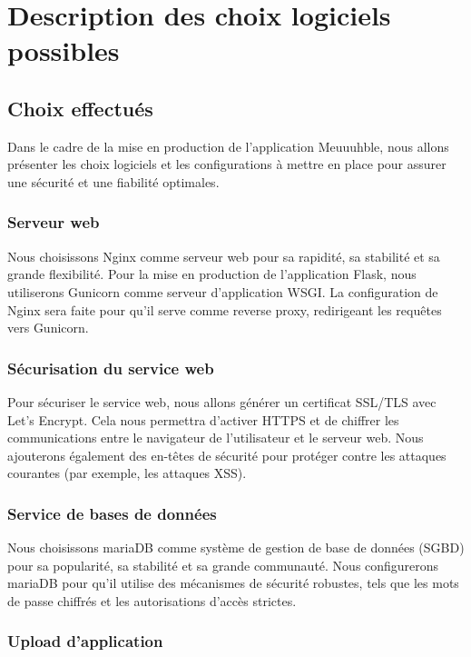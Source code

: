 \chapter{Description des choix logiciels possibles}

\section{Choix effectués}

Dans le cadre de la mise en production de l'application Meuuuhble, nous allons présenter les choix logiciels et les configurations à mettre en place pour assurer une sécurité et une fiabilité optimales.

\subsection{Serveur web}

Nous choisissons Nginx comme serveur web pour sa rapidité, sa stabilité et sa grande flexibilité. Pour la mise en production de l'application Flask, nous utiliserons Gunicorn comme serveur d'application WSGI. La configuration de Nginx sera faite pour qu'il serve comme reverse proxy, redirigeant les requêtes vers Gunicorn.

\subsection{Sécurisation du service web}

Pour sécuriser le service web, nous allons générer un certificat SSL/TLS avec Let's Encrypt. Cela nous permettra d'activer HTTPS et de chiffrer les communications entre le navigateur de l'utilisateur et le serveur web. Nous ajouterons également des en-têtes de sécurité pour protéger contre les attaques courantes (par exemple, les attaques XSS).

\subsection{Service de bases de données}

Nous choisissons mariaDB comme système de gestion de base de données (SGBD) pour sa popularité, sa stabilité et sa grande communauté. Nous configurerons mariaDB pour qu'il utilise des mécanismes de sécurité robustes, tels que les mots de passe chiffrés et les autorisations d'accès strictes.

\subsection{Upload d'application}

